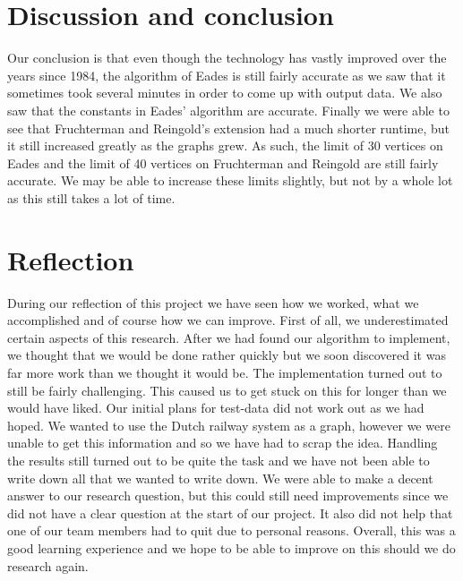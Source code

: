 \documentclass[a4paper,12pt]{article}
\begin{document}
\section{Discussion and conclusion}
Our conclusion is that even though the technology has vastly improved over the years since 1984, the algorithm of Eades is still fairly accurate as we saw that it sometimes took several minutes in order to come up with output data. We also saw that the constants in Eades' algorithm are accurate. Finally we were able to see that Fruchterman and Reingold's extension had a much shorter runtime, but it still increased greatly as the graphs grew. As such, the limit of 30 vertices on Eades and the limit of 40 vertices on Fruchterman and Reingold are still fairly accurate. We may be able to increase these limits slightly, but not by a whole lot as this still takes a lot of time.


\section{Reflection}
During our reflection of this project we have seen how we worked, what we accomplished and of course how we can improve. First of all, we underestimated certain aspects of this research. After we had found our algorithm to implement, we thought that we would be done rather quickly but we soon discovered it was far more work than we thought it would be. The implementation turned out to still be fairly challenging. This caused us to get stuck on this for longer than we would have liked. Our initial plans for test-data did not work out as we had hoped. We wanted to use the Dutch railway system as a graph, however we were unable to get this information and so we have had to scrap the idea. Handling the results still turned out to be quite the task and we have not been able to write down all that we wanted to write down. We were able to make a decent answer to our research question, but this could still need improvements since we did not have a clear question at the start of our project. It also did not help that one of our team members had to quit due to personal reasons. Overall, this was a good learning experience and we hope to be able to improve on this should we do research again.
\end{document}
